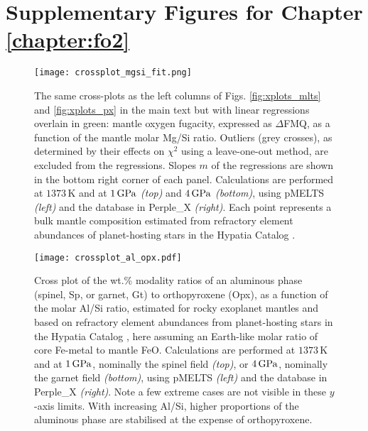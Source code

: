 \clearpage


\tochide\section{Supplementary Figures for Chapter \ref{chapter:fo2}}
\label{sec:supp-fo2}


\begin{figure}[!htb]
         \centering
\texttt{[image: crossplot\_mgsi\_fit.png]}
        \caption[Linear regression fit of mantle oxygen fugacity with Mg/Si ratio.]{The same cross-plots as the left columns of Figs. \ref{fig:xplots_mlts} and \ref{fig:xplots_px} in the main text but with linear regressions overlain in green: mantle oxygen fugacity, expressed as $\Delta$FMQ, as a function of the mantle molar Mg/Si ratio. Outliers (grey crosses), as determined by their effects on $\chi^2$ using a leave-one-out method, are excluded from the regressions. Slopes $m$ of the regressions are shown in the bottom right corner of each panel. Calculations are performed at $1373\,\text{K}$ and at $1\,{\rm GPa}$ \textit{(top)} and $4\,{\rm GPa}$ \textit{(bottom)}, using pMELTS \textit{(left)} and the \citet{jennings_simple_2015} database in Perple\_X \textit{(right)}. Each point represents a bulk mantle composition estimated from refractory element abundances of planet-hosting stars in the Hypatia Catalog \citep{hinkel_stellar_2014}.\label{fig:mgsi_fit}}
\end{figure}
\begin{figure}[!htb]
         \centering
\bigskip
\texttt{[image: crossplot\_al\_opx.pdf]}
        \caption[Modality ratios of spinel and garnet to orthopyroxene, as a function of Al/Si.]{Cross plot of the wt.\% modality ratios of an aluminous phase (spinel, Sp, or garnet, Gt) to orthopyroxene (Opx), as a function of the molar Al/Si ratio, estimated for rocky exoplanet mantles and based on refractory element abundances from planet-hosting stars in the Hypatia Catalog \citep{hinkel_stellar_2014}, here assuming an Earth-like molar ratio of core Fe-metal to mantle FeO. Calculations are performed at $1373\,\text{K}$ and at $1\,{\rm GPa}$, nominally the spinel field \textit{(top)}, or $4\,{\rm GPa}$, nominally the garnet field \textit{(bottom)}, using pMELTS \textit{(left)} and the \citet{jennings_simple_2015} database in Perple\_X \textit{(right)}. Note a few extreme cases are not visible in these $y$-axis limits. With increasing Al/Si, higher proportions of the aluminous phase are stabilised at the expense of orthopyroxene.\label{fig:alsi_opx}}
\end{figure}

\endgroup
